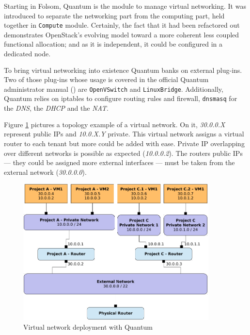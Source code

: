 \noindent Starting in Folsom, Quantum is the module to manage virtual networking. It was introduced to separate the networking part from the computing part, held together in \texttt{Compute} module. Certainly, the fact that it had been refactored out demonstrates OpenStack's evolving model toward a more coherent less coupled functional allocation; and as it is independent, it could be configured in a dedicated node.

To bring virtual networking into existence Quantum banks on external plug-ins. Two of those plug-ins whose usage is covered in the official Quantum administrator manual (\cite{quantumadminfolsom}) are \texttt{OpenVSwitch} and \texttt{LinuxBridge}. Additionally, Quantum relies on iptables to configure routing rules and firewall, \texttt{dnsmasq} for the \emph{DNS}, the \emph{DHCP} and the \emph{NAT}.

Figure \ref{fig:desplieguequantum} pictures a topology example of a virtual network. On it, \emph{30.0.0.X} represent public IPs and \emph{10.0.X.Y} private. This virtual network assigns a virtual router to each tenant but more could be added with ease. Private IP overlapping over different networks is possible as expected (\emph{10.0.0.2}). The routers public IPs --- they could be assigned more external interfaces --- must be taken from the external network (\emph{30.0.0.0}).

\begin{figure}[tbh]
\begin{center}
\includegraphics[width=0.9\textwidth]{imagenes/014.pdf}
 \caption{Virtual network deployment with Quantum}
\label{fig:desplieguequantum}
\end{center}
\end{figure}


